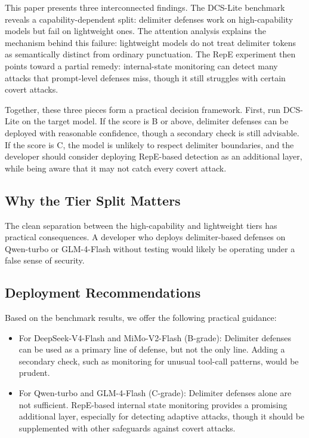 \documentclass[journal]{IEEEtran}
\begin{document}
This paper presents three interconnected findings. The DCS-Lite benchmark reveals a capability-dependent split: delimiter defenses work on high-capability models but fail on lightweight ones. The attention analysis explains the mechanism behind this failure: lightweight models do not treat delimiter tokens as semantically distinct from ordinary punctuation. The RepE experiment then points toward a partial remedy: internal-state monitoring can detect many attacks that prompt-level defenses miss, though it still struggles with certain covert attacks.

Together, these three pieces form a practical decision framework. First, run DCS-Lite on the target model. If the score is B or above, delimiter defenses can be deployed with reasonable confidence, though a secondary check is still advisable. If the score is C, the model is unlikely to respect delimiter boundaries, and the developer should consider deploying RepE-based detection as an additional layer, while being aware that it may not catch every covert attack.

\subsection{Why the Tier Split Matters}

The clean separation between the high-capability and lightweight tiers has practical consequences. A developer who deploys delimiter-based defenses on Qwen-turbo or GLM-4-Flash without testing would likely be operating under a false sense of security.

\subsection{Deployment Recommendations}

Based on the benchmark results, we offer the following practical guidance:
\begin{itemize}
    \item For DeepSeek-V4-Flash and MiMo-V2-Flash (B-grade): Delimiter defenses can be used as a primary line of defense, but not the only line. Adding a secondary check, such as monitoring for unusual tool-call patterns, would be prudent.
    \item For Qwen-turbo and GLM-4-Flash (C-grade): Delimiter defenses alone are not sufficient. RepE-based internal state monitoring provides a promising additional layer, especially for detecting adaptive attacks, though it should be supplemented with other safeguards against covert attacks.
\end{itemize}
\end{document}
